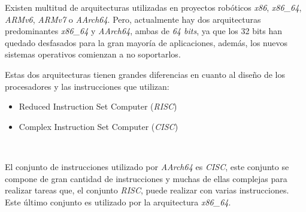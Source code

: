 Existen multitud de arquitecturas utilizadas en proyectos robóticos \textit{x86}, \textit{x86\_64}, \textit{ARMv6}, \textit{ARMv7} o \textit{AArch64}. Pero, actualmente hay dos arquitecturas predominantes \textit{x86\_64} y \textit{AArch64}, ambas de \textit{64 bits}, ya que los 32 bits han quedado desfasados para la gran mayoría de aplicaciones, además, los nuevos sistemas operativos comienzan a no soportarlos.\\ \cite{canonical32bits}

Estas dos arquitecturas tienen grandes diferencias en cuanto al diseño de los procesadores y las instrucciones que utilizan:
\begin{itemize}
	\item Reduced Instruction Set Computer (\textit{RISC})
	\item Complex Instruction Set Computer (\textit{CISC})
\end{itemize}\

El conjunto de instrucciones utilizado por \textit{AArch64} es \textit{CISC}, este conjunto se compone de gran cantidad de instrucciones y muchas de ellas complejas para realizar tareas que, el conjunto \textit{RISC}, puede realizar con varias instrucciones. Este último conjunto es utilizado por la arquitectura \textit{x86\_64}.\\

